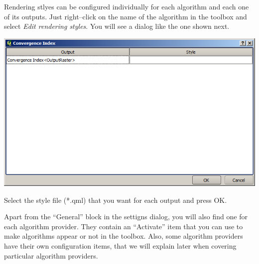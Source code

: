 Rendering stlyes can be configured individually for each algorithm and each one of its outputs. Just right--click on the name of the algorithm in the toolbox and select \emph{Edit rendering styles}. You will see a dialog like the one shown next.

\begin{center}
\includegraphics[width=.6\columnwidth]{rendering_styles.png}
\end{center}

Select the style file (*.qml) that you want for each output and press OK.

Apart from the ``General'' block in the settigns dialog, you will also find one for each algorithm provider. They contain an ``Activate'' item that you can use to make algorithms appear or not in the toolbox. Also, some algorithm providers have their own configuration items, that we will explain later when covering particular algorithm providers.
